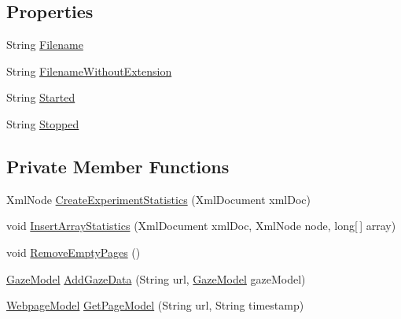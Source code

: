 \subsection*{Properties}
\begin{DoxyCompactItemize}
\item 
String \hyperlink{class_web_analyzer_1_1_models_1_1_data_model_1_1_test_model_a4353d075e751f00ca785cf5702f00910}{Filename}
\item 
String \hyperlink{class_web_analyzer_1_1_models_1_1_data_model_1_1_test_model_a91b896389e06b664e992c719f4d73e9b}{Filename\+Without\+Extension}
\item 
String \hyperlink{class_web_analyzer_1_1_models_1_1_data_model_1_1_test_model_acdb09845b9c3bc8582f78d2729524216}{Started}
\item 
String \hyperlink{class_web_analyzer_1_1_models_1_1_data_model_1_1_test_model_a636a8cedde376c835de9d909e8ec2c2d}{Stopped}
\end{DoxyCompactItemize}
\subsection*{Private Member Functions}
\begin{DoxyCompactItemize}
\item 
Xml\+Node \hyperlink{class_web_analyzer_1_1_models_1_1_data_model_1_1_test_model_aeb5429731ec41e1460952faf568e10be}{Create\+Experiment\+Statistics} (Xml\+Document xml\+Doc)
\item 
void \hyperlink{class_web_analyzer_1_1_models_1_1_data_model_1_1_test_model_a285dda9a94c63de7c47203f47e69e372}{Insert\+Array\+Statistics} (Xml\+Document xml\+Doc, Xml\+Node node, long\mbox{[}$\,$\mbox{]} array)
\item 
void \hyperlink{class_web_analyzer_1_1_models_1_1_data_model_1_1_test_model_a2fd8bf35c47c7fe3aee6537a1514ce10}{Remove\+Empty\+Pages} ()
\item 
\hyperlink{class_web_analyzer_1_1_models_1_1_data_model_1_1_gaze_model}{Gaze\+Model} \hyperlink{class_web_analyzer_1_1_models_1_1_data_model_1_1_test_model_adf086c022e7d9475f2e705665af0721a}{Add\+Gaze\+Data} (String url, \hyperlink{class_web_analyzer_1_1_models_1_1_data_model_1_1_gaze_model}{Gaze\+Model} gaze\+Model)
\item 
\hyperlink{class_web_analyzer_1_1_models_1_1_data_model_1_1_webpage_model}{Webpage\+Model} \hyperlink{class_web_analyzer_1_1_models_1_1_data_model_1_1_test_model_a6d6d0f87ceb7fe9a7ea38d49ae69b6f4}{Get\+Page\+Model} (String url, String timestamp)
\end{DoxyCompactItemize}
